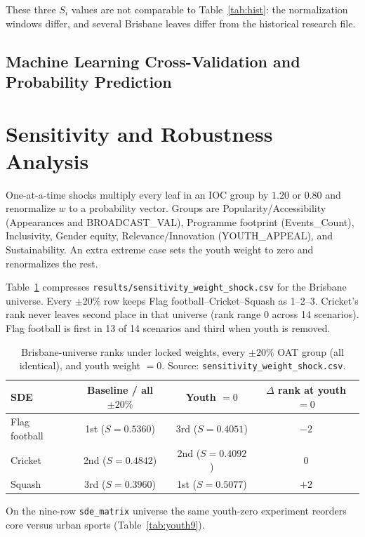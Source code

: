 \documentclass[12pt]{article}
\begin{document}
These three \(S_i\) values are not comparable to Table~\ref{tab:hist}: the
normalization windows differ, and several Brisbane leaves differ from the historical
research file.

\subsection{Machine Learning Cross-Validation and Probability Prediction}


\section{Sensitivity and Robustness Analysis}
\label{sec:sens}

One-at-a-time shocks multiply every leaf in an IOC group by \(1.20\) or \(0.80\) and
renormalize \(w\) to a probability vector. Groups are Popularity/Accessibility
(Appearances and BROADCAST\_VAL), Programme footprint (Events\_Count), Inclusivity,
Gender equity, Relevance/Innovation (YOUTH\_APPEAL), and Sustainability. An extra
extreme case sets the youth weight to zero and renormalizes the rest.

Table~\ref{tab:oat} compresses \texttt{results/sensitivity\_weight\_shock.csv} for
the Brisbane universe. Every \(\pm 20\%\) row keeps Flag football--Cricket--Squash as
1--2--3. Cricket's rank never leaves second place in that universe (rank range \(0\)
across 14 scenarios). Flag football is first in 13 of 14 scenarios and third when
youth is removed.

\begin{table}[htbp]
\centering
\caption{Brisbane-universe ranks under locked weights, every \(\pm 20\%\) OAT group
(all identical), and youth weight \(=0\). Source: \texttt{sensitivity\_weight\_shock.csv}.}
\label{tab:oat}
\begin{tabular}{l ccc}
\toprule
SDE & Baseline / all \(\pm 20\%\) & Youth \(=0\) & \(\Delta\) rank at youth \(=0\) \\
\midrule
Flag football & 1st (\(S=0.5360\)) & 3rd (\(S=0.4051\)) & \(-2\) \\
Cricket       & 2nd (\(S=0.4842\)) & 2nd (\(S=0.4092\)) & \(0\) \\
Squash        & 3rd (\(S=0.3960\)) & 1st (\(S=0.5077\)) & \(+2\) \\
\bottomrule
\end{tabular}
\end{table}

On the nine-row \texttt{sde\_matrix} universe the same youth-zero experiment
reorders core versus urban sports (Table~\ref{tab:youth9}).
\end{document}
